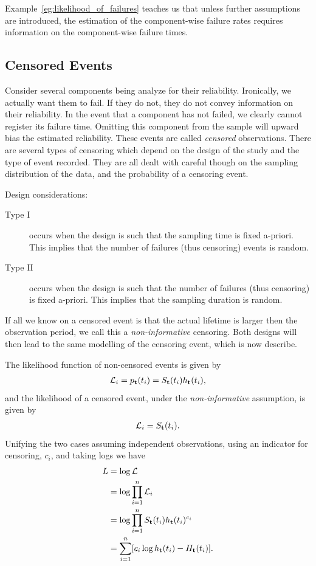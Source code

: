 Example~\ref{eg:likelihood_of_failures} teaches us that unless further assumptions are introduced, the estimation of the component-wise failure rates requires information on the component-wise failure times. 





\subsection{Censored Events}
Consider several components being analyze for their reliability. 
Ironically, we actually want them to fail. If they do not, they do not convey information on their reliability.
In the event that a component has not failed, we clearly cannot register its failure time. Omitting this component from the sample will upward bias the estimated reliability.
These events are called \emph{censored} observations. 
There are several types of censoring which depend on the design of the study and the type of event recorded. 
They are all dealt with careful though on the sampling distribution of the data, and the probability of a censoring event. 

Design considerations:
\begin{description}
\item [Type I] occurs when the design is such that the sampling time is fixed a-priori. This implies that the number of failures (thus censoring) events is random. 
\item [Type II] occurs when the design is such that the number of failures (thus censoring) is fixed a-priori. This implies that the sampling duration is random.
\end{description}
If all we know on a censored event is that the actual lifetime is larger then the observation period, we call this a \emph{non-informative} censoring. 
Both designs will then lead to the same modelling of the censoring event, which is now describe.

The likelihood function of non-censored events is given by
\begin{align}
	\mathcal{L}_i=p_{\mathbf{t}}(t_i)= S_{\mathbf{t}} (t_i) h_{\mathbf{t}} (t_i),
\end{align}
and the likelihood of a censored event, under the \emph{non-informative} assumption, is given by 
\begin{align}
	\mathcal{L}_i=S_{\mathbf{t}} (t_i) .
\end{align}
Unifying the two cases assuming independent observations, using an indicator for censoring, $c_i$, and taking logs we have
\begin{align}
	L &=\log \mathcal{L}\\ 
	&= \log \prod_{i=1}^{n} \mathcal{L}_i \\
	&= \log \prod_{i=1}^{n} S_{\mathbf{t}} (t_i) h_{\mathbf{t}} (t_i)^{c_i} \\
	&= \sum_{i=1}^{n} [c_i \log h_{\mathbf{t}} (t_i) - H_{\mathbf{t}} (t_i)]. \label{eq:censored_likelihood}
\end{align}


